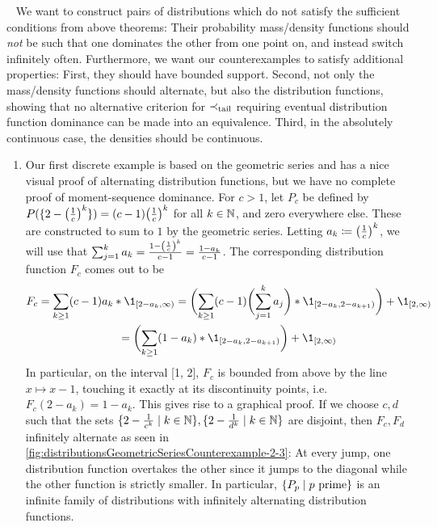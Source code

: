 \documentclass[a4paper]{scrreprt}
\begin{document}
    \begin{ex}~
        \label{ex:tailOrderSufficientConditionsCounterexamples}
        We want to construct pairs of distributions which do not satisfy the sufficient conditions from above theorems:
        Their probability mass/density functions should \emph{not} be such that one dominates the other from one point on, and instead switch infinitely often.
        Furthermore, we want our counterexamples to satisfy additional properties: 
        First, they should have bounded support. 
        Second, not only the mass/density functions should alternate, but also the distribution functions, showing that no alternative criterion for $\prec_{\text{tail}}$ requiring eventual distribution function dominance can be made into an equivalence.
        Third, in the absolutely continuous case, the densities should be continuous.      
    
        \begin{enumerate}
            \item
            \label{item:geometricSeriesSufficientTailOrderConditionCounterexample}
            Our first discrete example is based on the geometric series and has a nice visual proof of alternating distribution functions, but we have no complete proof of moment-sequence dominance.
            For $c > 1$, let $P_c$ be defined by $P(\{2-\bigl(\frac{1}{c}\bigr)^k\}) = (c-1)\bigl(\frac{1}{c}\bigr)^k$ for all $k \in \mathbb{N}$, and zero everywhere else.
            These are constructed to sum to $1$ by the geometric series.
            Letting $a_k \coloneqq \bigl(\frac{1}{c}\bigr)^k$, we will use that $\sum_{j = 1}^k  a_k = \frac{1 - \left(\frac{1}{c}\right)^k}{c - 1} = \frac{1 - a_k}{c - 1}$.
            The corresponding distribution function $F_c$ comes out to be 
            \begin{multline*}
                F_c 
                = \sum_{k \geq 1} (c-1) a_k * \1_{[2-a_k, \infty)}
                = \biggpars{\sum_{k \geq 1} (c-1) \biggpars{\sum_{j = 1}^k  a_j} * \1_{[2-a_k, 2-a_{k+1})}} + \1_{[2, \infty)} \\
                = \biggpars{\sum_{k \geq 1} (1-a_k) * \1_{[2-a_k, 2-a_{k+1})}} + \1_{[2, \infty)}
            \end{multline*}
            In particular, on the interval [1, 2], $F_c$ is bounded from above by the line $x \mapsto x-1$, touching it exactly at its discontinuity points, i.e. $F_c(2-a_k) = 1-a_k$. This gives rise to a graphical proof.
            If we choose $c, d$ such that the sets $\{2 - \frac{1}{c^k} \mid k \in \mathbb{N}\}, \{2 - \frac{1}{d^k} \mid k \in \mathbb{N}\}$ are disjoint,
            then $F_c, F_d$ infinitely alternate as seen in \autoref{fig:distributionsGeometricSeriesCounterexample-2-3}:
            At every jump, one distribution function overtakes the other since it jumps to the diagonal while the other function is strictly smaller.
            In particular, $\{P_p \mid p \text{ prime}\}$ is an infinite family of distributions with infinitely alternating distribution functions.
            

\end{enumerate}
\end{ex}
\end{document}
